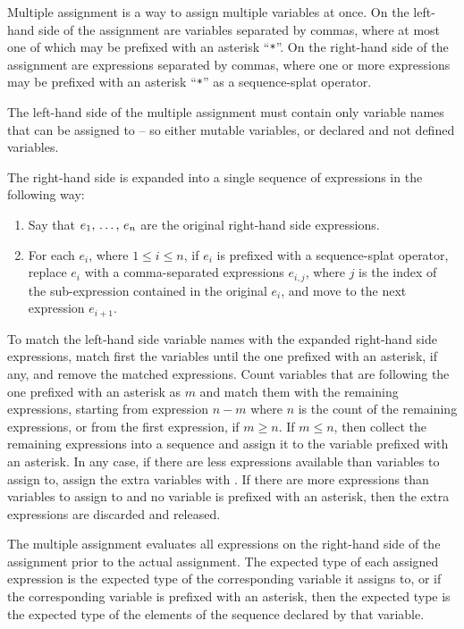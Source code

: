 Multiple assignment is a way to assign multiple variables at once. On the left-hand side of the assignment are variables separated by commas, where at most one of which may be prefixed with an asterisk ``\lstinline!*!''. On the right-hand side of the assignment are expressions separated by commas, where one or more expressions may be prefixed with an asterisk ``\lstinline!*!'' as a sequence-splat operator. 

The left-hand side of the multiple assignment must contain only variable names that can be assigned to -- so either mutable variables, or declared and not defined variables. 

The right-hand side is expanded into a single sequence of expressions in the following way:
\begin{enumerate}
\item Say that $e_1 ,\, \ldots ,\, e_n$ are the original right-hand side expressions. 

\item For each $e_i$, where $1 \leq i \leq n$, if $e_i$ is prefixed with a sequence-splat operator, replace $e_i$ with a comma-separated expressions $e_{i,j}$, where $j$ is the index of the sub-expression contained in the original $e_i$, and move to the next expression $e_{i+1}$. 
\end{enumerate}

To match the left-hand side variable names with the expanded right-hand side expressions, match first the variables until the one prefixed with an asterisk, if any, and remove the matched expressions. Count variables that are following the one prefixed with an asterisk as $m$ and match them with the remaining expressions, starting from expression $n - m$ where $n$ is the count of the remaining expressions, or from the first expression, if $m \geq n$. If $m \leq n$, then collect the remaining expressions into a sequence and assign it to the variable prefixed with an asterisk. In any case, if there are less expressions available than variables to assign to, assign the extra variables with . If there are more expressions than variables to assign to and no variable is prefixed with an asterisk, then the extra expressions are discarded and released. 

The multiple assignment evaluates all expressions on the right-hand side of the assignment prior to the actual assignment. The expected type of each assigned expression is the expected type of the corresponding variable it assigns to, or if the corresponding variable is prefixed with an asterisk, then the expected type is the expected type of the elements of the sequence declared by that variable. 


